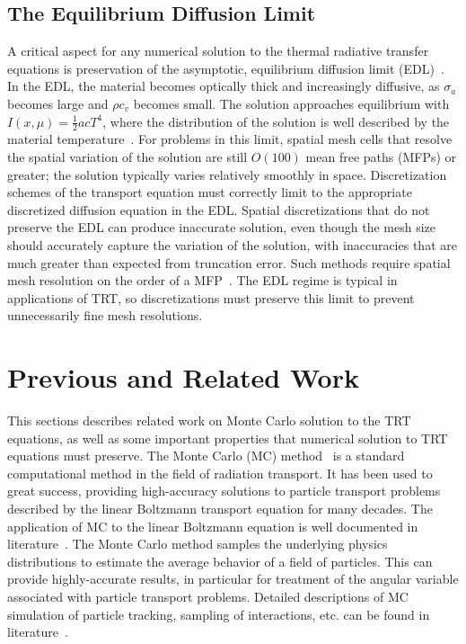 \subsection{The Equilibrium Diffusion Limit}

A critical aspect for any numerical solution to the thermal radiative transfer equations
is preservation of the asymptotic, equilibrium diffusion limit (EDL)~\cite{morel_ldtrt,larsen_edl}.
In the EDL, the material becomes optically thick and increasingly diffusive, as $\sigma_a$ becomes large and
$\rho c_v$ becomes small.  The solution approaches equilibrium with $I(x,\mu)=\frac{1}{2}acT^4$,
where the distribution of the solution is well described by the material
temperature~\cite{larsen_edl}.  For problems in this limit, spatial mesh cells that resolve the spatial variation of the solution are
still $O(100)$ mean free paths (MFPs) or greater; the solution typically varies relatively smoothly in space.
Discretization schemes of the transport equation must correctly limit to the appropriate
discretized diffusion equation in the EDL.  Spatial discretizations that do not preserve
the EDL can produce inaccurate solution, even though the mesh size should accurately capture the variation of the solution, with
inaccuracies that are much greater than expected from truncation error.  Such methods
require spatial mesh resolution on the order of a MFP~\cite{morel_ldtrt}.  The EDL regime is typical in
applications of TRT, so discretizations must preserve this limit to prevent unnecessarily
fine mesh resolutions.

\section{Previous and Related Work}

This sections describes related work on Monte Carlo solution to the TRT equations, as well
as some important properties that numerical solution to TRT equations must preserve.  
The Monte Carlo (MC) method~\cite{shultis_mc} is a standard computational method in
the field of radiation transport.  It has been used to great success, providing high-accuracy
solutions to particle
transport problems described by the linear Boltzmann transport equation for many decades.  The application of MC to the linear Boltzmann
equation is well documented in
literature~\cite{mcnp,shultis_mc,lewis}.  The Monte Carlo method samples the underlying physics distributions to estimate the
average behavior of a field of particles.  This can provide highly-accurate results, in
particular for treatment of the angular variable associated with particle transport
problems.  Detailed descriptions of MC simulation of particle tracking, sampling of
interactions, etc. can be found in literature~\cite{mcnp,wollaber_review,shultis_mc}.

